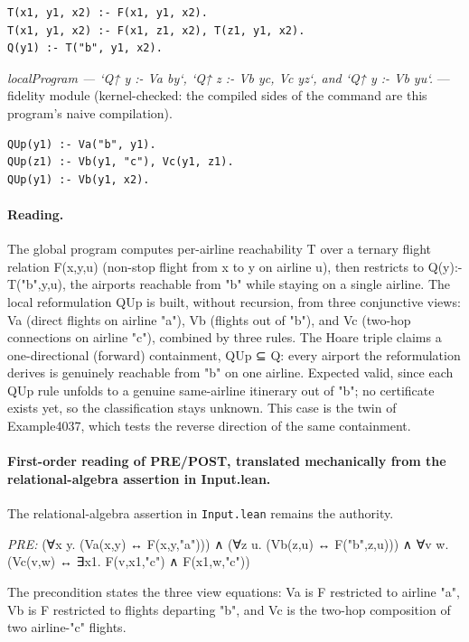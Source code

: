 \documentclass[10pt]{article}
\begin{document}
\begin{Verbatim}[fontsize=\scriptsize,breaklines=true,breakanywhere=true,frame=single,framesep=1.5mm]
T(x1, y1, x2) :- F(x1, y1, x2).
T(x1, y1, x2) :- F(x1, z1, x2), T(z1, y1, x2).
Q(y1) :- T("b", y1, x2).
\end{Verbatim}

{\raggedright\textit{localProgram --- `Q↑ y :- Va by`, `Q↑ z :- Vb yc, Vc yz`, and `Q↑ y :- Vb yu`.} --- fidelity module (kernel-checked: the compiled sides of the command are this program's naive compilation).\par}

\begin{Verbatim}[fontsize=\scriptsize,breaklines=true,breakanywhere=true,frame=single,framesep=1.5mm]
QUp(y1) :- Va("b", y1).
QUp(z1) :- Vb(y1, "c"), Vc(y1, z1).
QUp(y1) :- Vb(y1, x2).
\end{Verbatim}

\paragraph{Reading.} The global program computes per-airline reachability T over a ternary flight relation F(x,y,u) (non-stop flight from x to y on airline u), then restricts to Q(y):-T("b",y,u), the airports reachable from "b" while staying on a single airline. The local reformulation QUp is built, without recursion, from three conjunctive views: Va (direct flights on airline "a"), Vb (flights out of "b"), and Vc (two-hop connections on airline "c"), combined by three rules. The Hoare triple claims a one-directional (forward) containment, QUp ⊆ Q: every airport the reformulation derives is genuinely reachable from "b" on one airline. Expected valid, since each QUp rule unfolds to a genuine same-airline itinerary out of "b"; no certificate exists yet, so the classification stays unknown. This case is the twin of Example4037, which tests the reverse direction of the same containment.

\paragraph{First-order reading of PRE/POST, translated mechanically from the relational-algebra assertion in Input.lean.} The relational-algebra assertion in \texttt{Input.lean} remains the authority.

\textit{PRE:} (∀x y. (Va(x,y) ↔ F(x,y,"a"))) ∧ (∀z u. (Vb(z,u) ↔ F("b",z,u))) ∧ ∀v w. (Vc(v,w) ↔ ∃x1. F(v,x1,"c") ∧ F(x1,w,"c"))\par The precondition states the three view equations: Va is F restricted to airline "a", Vb is F restricted to flights departing "b", and Vc is the two-hop composition of two airline-"c" flights.
\end{document}
